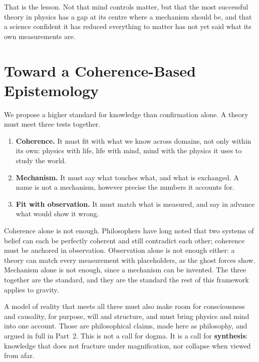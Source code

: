 \documentclass[11pt,a4paper]{article}
\begin{document}
That is the lesson. Not that mind controls matter, but that the most successful theory in physics has a gap at its centre where a mechanism should be, and that a science confident it has reduced everything to matter has not yet said what its own measurements are.

\section{Toward a Coherence-Based Epistemology}
\label{sec:epistemology}

We propose a higher standard for knowledge than confirmation alone. A theory must meet three tests together.
\begin{enumerate}
    \item \textbf{Coherence.} It must fit with what we know across domains, not only within its own: physics with life, life with mind, mind with the physics it uses to study the world.
    \item \textbf{Mechanism.} It must say what touches what, and what is exchanged. A name is not a mechanism, however precise the numbers it accounts for.
    \item \textbf{Fit with observation.} It must match what is measured, and say in advance what would show it wrong.
\end{enumerate}

Coherence alone is not enough. Philosophers have long noted that two systems of belief can each be perfectly coherent and still contradict each other; coherence must be anchored in observation. Observation alone is not enough either: a theory can match every measurement with placeholders, as the ghost forces show. Mechanism alone is not enough, since a mechanism can be invented. The three together are the standard, and they are the standard the rest of this framework applies to gravity.


A model of reality that meets all three must also make room for consciousness and causality, for purpose, will and structure, and must bring physics and mind into one account. Those are philosophical claims, made here as philosophy, and argued in full in Part~2. This is not a call for dogma. It is a call for \textbf{synthesis}: knowledge that does not fracture under magnification, nor collapse when viewed from afar.
\end{document}
